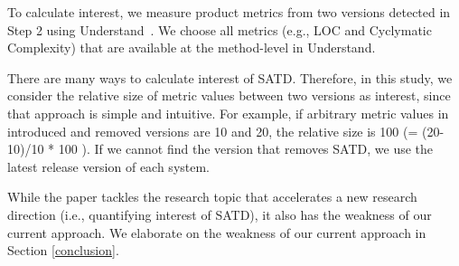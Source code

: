 To calculate interest, we measure product metrics from two versions detected in Step 2 using {\sc Understand}~\cite{Understand}. We choose all metrics (e.g., LOC and Cyclymatic Complexity) that are available at the method-level in {\sc Understand}.

There are many ways to calculate interest of SATD. Therefore, in this study, we consider the relative size of metric values between two versions as interest, since that approach is simple and intuitive. For example, if arbitrary metric values in introduced and removed versions are 10 and 20, the relative size is 100 (= (20-10)/10 * 100 ).
If we cannot find the version that removes SATD, 
we use the latest release version of each system. 

While the paper tackles the research topic that accelerates a new research direction (i.e., quantifying interest of SATD), it also has the weakness of our current approach. We elaborate on the weakness of our current approach in Section \ref{conclusion}.